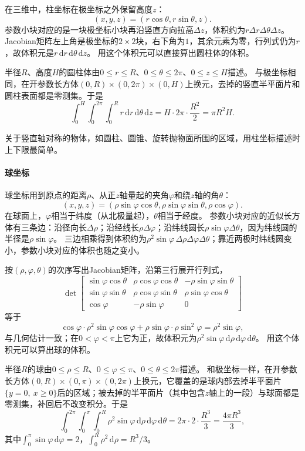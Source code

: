 在三维中，柱坐标在极坐标之外保留高度$z$：
\[
 (x,y,z)=(r\cos\theta,r\sin\theta,z).
\]
参数小块对应的是一块极坐标小块再沿竖直方向拉高$\Delta z$，体积约为$r\Delta r\Delta\theta\Delta z$。
Jacobian矩阵左上角是极坐标的$2\times2$块，右下角为$1$，其余元素为零，行列式仍为$r$，故体积元是$r\,\mathrm dr\,\mathrm d\theta\,\mathrm dz$。
用这个体积元可以直接算出圆柱体的体积。
\begin{example}[圆柱体的体积]
\label{ex:region-cylinder-volume}
半径$R$、高度$H$的圆柱体由$0\leq r\leq R$、$0\leq\theta\leq2\pi$、$0\leq z\leq H$描述。
与极坐标相同，在开参数长方体$(0,R)\times(0,2\pi)\times(0,H)$上换元，去掉的竖直半平面片和圆柱表面都是零测集。于是
\[
 \int_0^H\int_0^{2\pi}\int_0^R r\,\mathrm dr\,\mathrm d\theta\,\mathrm dz
 =H\cdot2\pi\cdot\frac{R^2}{2}=\pi R^2H.
\]
\end{example}

关于竖直轴对称的物体，如圆柱、圆锥、旋转抛物面所围的区域，用柱坐标描述时上下限最简单。

\paragraph{球坐标}

球坐标用到原点的距离$\rho$、从正$z$轴量起的夹角$\varphi$和绕$z$轴的角$\theta$：
\[
 (x,y,z)=(\rho\sin\varphi\cos\theta,\rho\sin\varphi\sin\theta,\rho\cos\varphi).
\]
在球面上，$\varphi$相当于纬度（从北极量起），$\theta$相当于经度。
参数小块对应的近似长方体有三条边：沿径向长$\Delta\rho$；沿经线长$\rho\Delta\varphi$；沿纬线圆长$\rho\sin\varphi\Delta\theta$，因为纬线圆的半径是$\rho\sin\varphi$。
三边相乘得到体积约为$\rho^2\sin\varphi\,\Delta\rho\Delta\varphi\Delta\theta$；靠近两极时纬线圆变小，参数小块对应的体积也随之变小。

按$(\rho,\varphi,\theta)$的次序写出Jacobian矩阵，沿第三行展开行列式，
\[
 \det\begin{bmatrix}
 \sin\varphi\cos\theta&\rho\cos\varphi\cos\theta&-\rho\sin\varphi\sin\theta\\
 \sin\varphi\sin\theta&\rho\cos\varphi\sin\theta&\rho\sin\varphi\cos\theta\\
 \cos\varphi&-\rho\sin\varphi&0
 \end{bmatrix}
\]
等于
\[
 \cos\varphi\cdot\rho^2\sin\varphi\cos\varphi+\rho\sin\varphi\cdot\rho\sin^2\varphi
 =\rho^2\sin\varphi,
\]
与几何估计一致；在$0<\varphi<\pi$上它为正，故体积元为$\rho^2\sin\varphi\,\mathrm d\rho\,\mathrm d\varphi\,\mathrm d\theta$。
用这个体积元可以算出球的体积。
\begin{example}[球的体积]
\label{ex:region-ball-volume}
半径$R$的球由$0\leq\rho\leq R$、$0\leq\varphi\leq\pi$、$0\leq\theta\leq2\pi$描述。
和极坐标一样，在开参数长方体$(0,R)\times(0,\pi)\times(0,2\pi)$上换元，它覆盖的是球内部去掉半平面片$\{y=0,\ x\geq0\}$后的区域；被去掉的半平面片（其中包含$z$轴上的一段）与球面都是零测集，补回后不改变积分。于是
\[
 \int_0^{2\pi}\int_0^\pi\int_0^R\rho^2\sin\varphi\,\mathrm d\rho\,\mathrm d\varphi\,\mathrm d\theta
 =2\pi\cdot2\cdot\frac{R^3}{3}
 =\frac{4\pi R^3}{3},
\]
其中$\int_0^\pi\sin\varphi\,\mathrm d\varphi=2$，$\int_0^R\rho^2\,\mathrm d\rho=R^3/3$。
\end{example}

